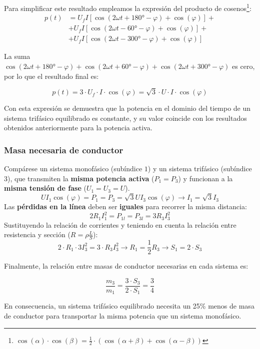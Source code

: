 Para simplificar este resultado empleamos la expresión del producto de cosenos\footnote{$
  \cos(\alpha) \cdot \cos(\beta) = \frac{1}{2} \cdot (\cos(\alpha + \beta) + \cos(\alpha - \beta))$}:
\begin{align*}
  p(t) &= U_f I [\cos(2 \omega t + \ang{180} -\varphi) + \cos(\varphi)] +\\
       &+ U_f I [\cos(2 \omega t - \ang{60} - \varphi) + \cos(\varphi)] +\\
       &+ U_f I [\cos(2 \omega t - \ang{300} - \varphi) + \cos(\varphi)]
\end{align*}

La suma $\cos(2 \omega t + \ang{180} -\varphi) + \cos(2 \omega t + \ang{60} -\varphi) + \cos(2 \omega t + \ang{300} -\varphi)$ es cero, por lo que el resultado final es:

\[
  p(t) = 3 \cdot U_f \cdot I \cdot \cos (\varphi) = \sqrt{3} \cdot U \cdot I \cdot \cos (\varphi) 
\]

Con esta expresión se demuestra que la potencia en el dominio del tiempo de un sistema trifásico equilibrado es constante, y su valor coincide con los resultados obtenidos anteriormente para la potencia activa. 


        \subsubsection{Masa necesaria de conductor}

        Compárese un sistema monofásico (subíndice $1$) y un sistema trifásico (subíndice $3$), que transmiten la \textbf{misma potencia activa} ($P_1=P_3$) y funcionan a la \textbf{misma tensión de fase} ($U_1=U_3=U$).
\[
U I_1 \cos(\varphi) = P_1 = P_3 = \sqrt{3}U I_3 \cos(\varphi) \rightarrow {I_1 = \sqrt{3} I_3}
\]
Las \textbf{pérdidas en la línea} deben ser \textbf{iguales} para recorrer la {misma distancia}:
\[
  2R_1I_1^2 = P_{1l} = P_{3l} = 3R_3I_3^2
\]
Sustituyendo la relación de corrientes y teniendo en cuenta la relación entre resistencia y sección ($R=\rho\frac{L}{S}$):
\[
  2\cdot R_1 \cdot 3I_3^2 = 3\cdot R_3 I_3^2 \rightarrow R_1 = \frac{1}{2} R_3 \rightarrow {S_1 = 2 \cdot S_3}
\]

Finalmente, la relación entre masas de conductor necesarias en cada sistema es:

\[
  \frac{m_3}{m_1} = \frac{3 \cdot S_3}{2 \cdot S_1} = \frac{3}{4}
\]

En consecuencia, un sistema trifásico equilibrado necesita un 25\% menos de masa de conductor para transportar la misma potencia que un sistema monofásico.

